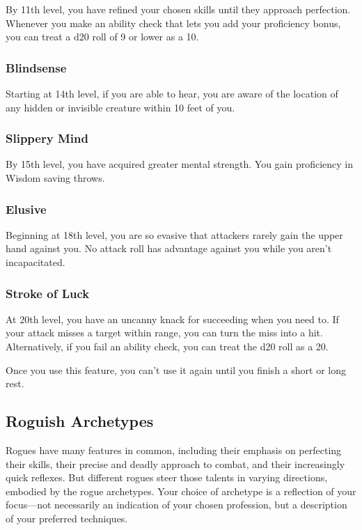 By 11th level, you have refined your chosen skills until they approach perfection. Whenever you make an ability check that lets you add your proficiency bonus, you can treat a d20 roll of 9 or lower as a 10.

\subsubsection{Blindsense}

Starting at 14th level, if you are able to hear, you are aware of the location of any hidden or invisible creature within 10 feet of you.

\subsubsection{Slippery Mind}

By 15th level, you have acquired greater mental strength. You gain proficiency in Wisdom saving throws.

\subsubsection{Elusive}

Beginning at 18th level, you are so evasive that attackers rarely gain the upper hand against you. No attack roll has advantage against you while you aren't incapacitated.

\subsubsection{Stroke of Luck}

At 20th level, you have an uncanny knack for succeeding when you need to. If your attack misses a target within range, you can turn the miss into a hit. Alternatively, if you fail an ability check, you can treat the d20 roll as a 20.

Once you use this feature, you can't use it again until you finish a short or long rest.

\subsection{Roguish Archetypes}

Rogues have many features in common, including their emphasis on perfecting their skills, their precise and deadly approach to combat, and their increasingly quick reflexes. But different rogues steer those talents in varying directions, embodied by the rogue archetypes. Your choice of archetype is a reflection of your focus—not necessarily an indication of your chosen profession, but a description of your preferred techniques.

